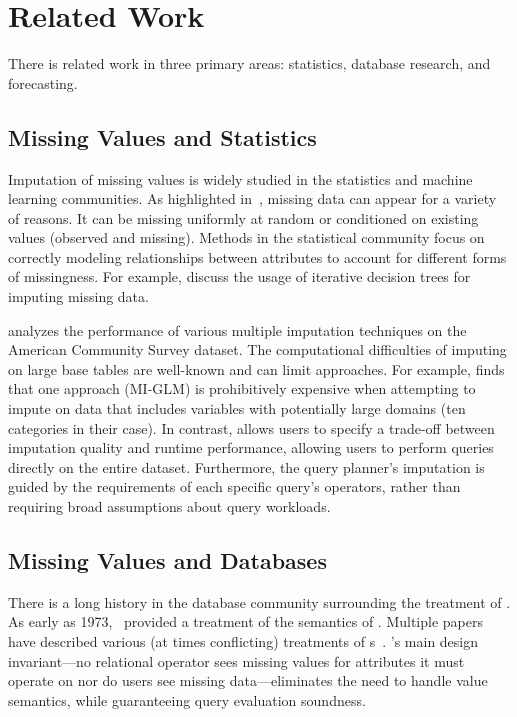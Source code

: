 \section{Related Work}

There is related work in three primary areas: statistics, database research, and forecasting.

\subsection{Missing Values and Statistics}

Imputation of missing values is widely studied in the statistics and machine
learning communities. As highlighted in~\cite{gelman2006data}, missing data
can appear for a variety of reasons.
It can be missing uniformly at random or conditioned on
existing values (observed and missing). Methods in the statistical community
focus on correctly modeling relationships between attributes to account for different forms
of missingness. For example, \cite{burgette2010multiple} discuss the
usage of iterative decision trees for imputing missing data.

\cite{akande2015empirical} analyzes the performance of various
multiple imputation techniques on the American Community Survey dataset. 
The computational difficulties of imputing on large base
tables are well-known and can limit approaches. For example, \cite{akande2015empirical} finds that
one approach (MI-GLM) is prohibitively expensive when attempting to impute on data that
includes variables with potentially large domains (ten categories in their case).
In contrast, \ProjectName{} allows users to specify a trade-off between
imputation quality and runtime performance, allowing users to perform queries
directly on the entire dataset. Furthermore,
the query planner's imputation is guided by the requirements of each specific
query's operators, rather than requiring broad assumptions about query
workloads.  

\subsection{Missing Values and Databases}
There is a long history in the database community surrounding the
treatment of \nullv{}. As early as 1973,~\cite{codd1973understanding}
provided a treatment of the semantics of \nullv{}. Multiple
papers have described various (at times conflicting) treatments
of \nullv{}s~\cite{grant1977null}. \ProjectName's main design invariant---no relational operator
sees missing values for attributes it must operate on nor do users see
missing data---eliminates
the need to handle \nullv{} value semantics, while guaranteeing query evaluation soundness.

